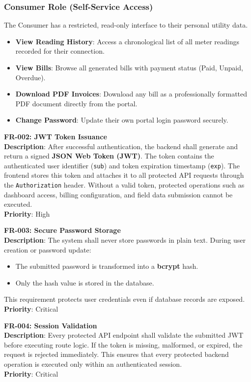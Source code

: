 \documentclass[12pt, a4paper, onecolumn]{report}
\begin{document}
\subsubsection{Consumer Role (Self-Service Access)}
The Consumer has a restricted, read-only interface to their personal utility data.
\begin{itemize}
    \item \textbf{View Reading History}: Access a chronological list of all meter readings recorded for their connection.
    \item \textbf{View Bills}: Browse all generated bills with payment status (Paid, Unpaid, Overdue).
    \item \textbf{Download PDF Invoices}: Download any bill as a professionally formatted PDF document directly from the portal.
    \item \textbf{Change Password}: Update their own portal login password securely.
\end{itemize}

\textbf{FR-002: JWT Token Issuance} \\
\textbf{Description}: After successful authentication, the backend shall generate and return a signed \textbf{JSON Web Token (JWT)}. The token contains the authenticated user identifier (\texttt{sub}) and token expiration timestamp (\texttt{exp}). The frontend stores this token and attaches it to all protected API requests through the \texttt{Authorization} header. Without a valid token, protected operations such as dashboard access, billing configuration, and field data submission cannot be executed. \\
\textbf{Priority}: High

\textbf{FR-003: Secure Password Storage} \\
\textbf{Description}: The system shall never store passwords in plain text. During user creation or password update:
\begin{itemize}
    \item The submitted password is transformed into a \textbf{bcrypt} hash.
    \item Only the hash value is stored in the database.
\end{itemize}
This requirement protects user credentials even if database records are exposed. \\
\textbf{Priority}: Critical

\textbf{FR-004: Session Validation} \\
\textbf{Description}: Every protected API endpoint shall validate the submitted JWT before executing route logic. If the token is missing, malformed, or expired, the request is rejected immediately. This ensures that every protected backend operation is executed only within an authenticated session. \\
\textbf{Priority}: Critical
\end{document}
